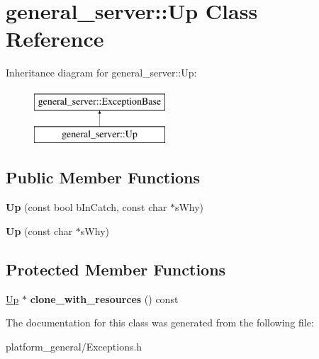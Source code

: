 \hypertarget{classgeneral__server_1_1Up}{\section{general\-\_\-server\-:\-:\-Up \-Class \-Reference}
\label{classgeneral__server_1_1Up}
}
\-Inheritance diagram for general\-\_\-server\-:\-:\-Up\-:\begin{figure}[H]
\begin{center}
\leavevmode
\includegraphics[height=2.000000cm]{classgeneral__server_1_1Up}
\end{center}
\end{figure}
\subsection*{\-Public \-Member \-Functions}
\begin{DoxyCompactItemize}
\item 
\hypertarget{classgeneral__server_1_1Up_a0dfbcc06804473d8eb5c3b00247f8b03}{{\bfseries \-Up} (const bool b\-In\-Catch, const char $\ast$s\-Why)}\label{classgeneral__server_1_1Up_a0dfbcc06804473d8eb5c3b00247f8b03}

\item 
\hypertarget{classgeneral__server_1_1Up_a751891c2116435c67b52a97ee316705a}{{\bfseries \-Up} (const char $\ast$s\-Why)}\label{classgeneral__server_1_1Up_a751891c2116435c67b52a97ee316705a}

\end{DoxyCompactItemize}
\subsection*{\-Protected \-Member \-Functions}
\begin{DoxyCompactItemize}
\item 
\hypertarget{classgeneral__server_1_1Up_a05c186f72828089a190658159ce59005}{\hyperlink{classgeneral__server_1_1Up}{\-Up} $\ast$ {\bfseries clone\-\_\-with\-\_\-resources} () const }\label{classgeneral__server_1_1Up_a05c186f72828089a190658159ce59005}

\end{DoxyCompactItemize}


\-The documentation for this class was generated from the following file\-:\begin{DoxyCompactItemize}
\item 
platform\-\_\-general/\-Exceptions.\-h\end{DoxyCompactItemize}
